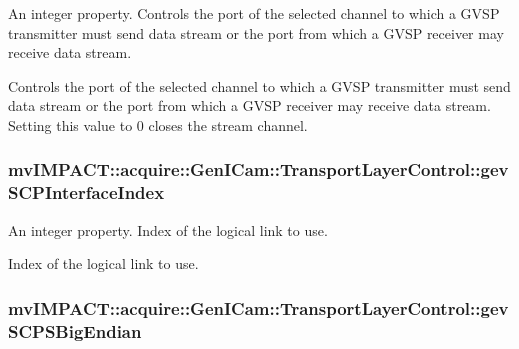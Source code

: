 An integer property. Controls the port of the selected channel to which a G\+V\+S\+P transmitter must send data stream or the port from which a G\+V\+S\+P receiver may receive data stream. 

Controls the port of the selected channel to which a G\+V\+S\+P transmitter must send data stream or the port from which a G\+V\+S\+P receiver may receive data stream. Setting this value to 0 closes the stream channel. \hypertarget{classmv_i_m_p_a_c_t_1_1acquire_1_1_gen_i_cam_1_1_transport_layer_control_a2d9f217953d1bb14a5fdfc195c199d94}{
\subsubsection[{gev\+S\+C\+P\+Interface\+Index}]{ mv\+I\+M\+P\+A\+C\+T\+::acquire\+::\+Gen\+I\+Cam\+::\+Transport\+Layer\+Control\+::gev\+S\+C\+P\+Interface\+Index}}\label{classmv_i_m_p_a_c_t_1_1acquire_1_1_gen_i_cam_1_1_transport_layer_control_a2d9f217953d1bb14a5fdfc195c199d94}


An integer property. Index of the logical link to use. 

Index of the logical link to use. \hypertarget{classmv_i_m_p_a_c_t_1_1acquire_1_1_gen_i_cam_1_1_transport_layer_control_afce4d838f778e9d0f3459231c0284b2f}{
\subsubsection[{gev\+S\+C\+P\+S\+Big\+Endian}]{ mv\+I\+M\+P\+A\+C\+T\+::acquire\+::\+Gen\+I\+Cam\+::\+Transport\+Layer\+Control\+::gev\+S\+C\+P\+S\+Big\+Endian}}\label{classmv_i_m_p_a_c_t_1_1acquire_1_1_gen_i_cam_1_1_transport_layer_control_afce4d838f778e9d0f3459231c0284b2f}


